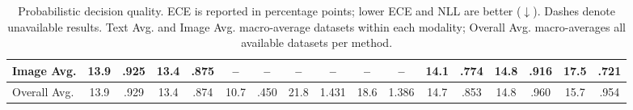 \begin{table}[t]
{\begin{tabular}{l cc cc cc cc cc | cc cc cc}
\midrule
Image Avg.
& 13.9 & .925
& 13.4 & .875
& -- & --
& -- & --
& -- & --
& 14.1 & .774
& 14.8 & .916
& 17.5 & .721 \\
\midrule

Overall Avg.
& 13.9 & .929
& 13.4 & .874
& 10.7 & .450
& 21.8 & 1.431
& 18.6 & 1.386
& 14.7 & .853
& 14.8 & .960
& 15.7 & .954 \\

\bottomrule
\end{tabular}
}
\caption{Probabilistic decision quality. ECE is reported in percentage points;
lower ECE and NLL are better ($\downarrow$). Dashes denote unavailable results.
Text Avg. and Image Avg. macro-average datasets within each modality; Overall Avg. macro-averages all available datasets per method.}
\label{tab:probability}
\end{table}